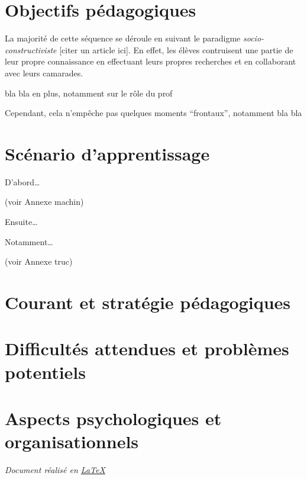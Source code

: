 \documentclass[11pt,bibliography=totoc]{scrartcl}
\begin{document}
\section{Objectifs pédagogiques}
La majorité de cette séquence se déroule en suivant le paradigme
\textit{socio-constructiviste} [citer un article ici]. En effet, les élèves
contruisent une partie de leur propre connaissance en effectuant leurs propres
recherches et en collaborant avec leurs camarades.

bla bla en plus, notamment sur le rôle du prof

Cependant, cela n'empêche pas quelques moments ``frontaux'', notamment bla bla 

\section{Scénario d'apprentissage}
D'abord\ldots

(voir Annexe machin)

Ensuite\ldots

Notamment\ldots

(voir Annexe truc)

\section{Courant et stratégie pédagogiques}

\section{Difficultés attendues et problèmes potentiels}

\section{Aspects psychologiques et organisationnels}




\vfill
\emph{Document réalisé en \href{https://www.latex-project.org/}{\LaTeX}}
\end{document}
